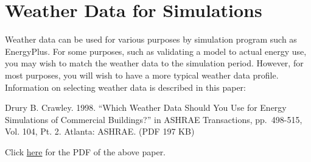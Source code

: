\section{Weather Data for Simulations}\label{weather-data-for-simulations}

Weather data can be used for various purposes by simulation program such as EnergyPlus. For some purposes, such as validating a model to actual energy use, you may wish to match the weather data to the simulation period. However, for most purposes, you will wish to have a more typical weather data profile. Information on selecting weather data is described in this paper:

Drury B. Crawley. 1998. ``Which Weather Data Should You Use for Energy Simulations of Commercial Buildings?'' in ASHRAE Transactions, pp.~498-515, Vol. 104, Pt. 2. Atlanta: ASHRAE. (PDF 197 KB)

Click \href{https://energyplus.net/sites/all/modules/custom/weather/weather_files/whichweatherdatashouldyouuseforenergysimulations.pdf}{here} for the PDF of the above paper.

